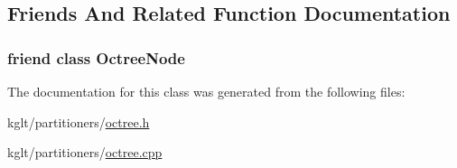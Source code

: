 \subsection{Friends And Related Function Documentation}
\hypertarget{classkglt_1_1_octree_a8b24235b6b0c86da018f898416ecd2e8}{
\subsubsection[{Octree\-Node}]{\setlength{\rightskip}{0pt plus 5cm}friend class {\bf Octree\-Node}\hspace{0.3cm}{\ttfamily [friend]}}}\label{classkglt_1_1_octree_a8b24235b6b0c86da018f898416ecd2e8}


The documentation for this class was generated from the following files\-:\begin{DoxyCompactItemize}
\item 
kglt/partitioners/\hyperlink{octree_8h}{octree.\-h}\item 
kglt/partitioners/\hyperlink{octree_8cpp}{octree.\-cpp}\end{DoxyCompactItemize}
